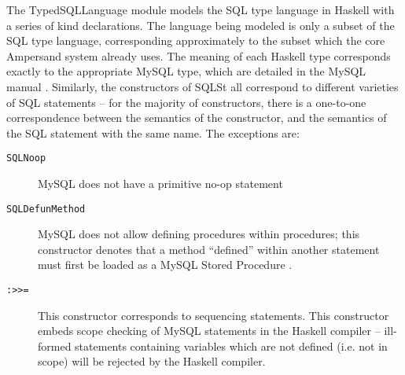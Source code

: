 The TypedSQLLanguage module models the SQL type language in Haskell with a
series of kind declarations. The language being modeled is only a subset of 
the
SQL type language, corresponding approximately to the subset which the core
Ampersand system already uses. The meaning of each Haskell type corresponds
exactly to the appropriate MySQL type, which are detailed in the MySQL
manual \citep{mySQLman}. Similarly, the constructors of SQLSt all correspond
to different varieties of SQL statements -- for the majority of 
constructors,
there is a one-to-one correspondence between the semantics of the 
constructor,
and the semantics of the SQL statement with the same name. The exceptions 
are:     
    \begin{description}
        \item[\texttt{SQLNoop}] MySQL does not have a primitive no-op statement
        \item[\texttt{SQLDefunMethod}]  MySQL does not allow defining 
        procedures within procedures; 
        this constructor denotes that a method ``defined'' within another 
        statement must 
        first be loaded as a MySQL Stored Procedure \citep{mySQLman}.
        \item[\texttt{:>>=}] This constructor corresponds to sequencing 
        statements. This constructor
        embeds scope checking of MySQL statements in the Haskell compiler -- 
        ill-formed statements
        containing variables which are not defined (i.e. not in scope) will be 
        rejected by the Haskell
        compiler. 
    \end{description}
    
